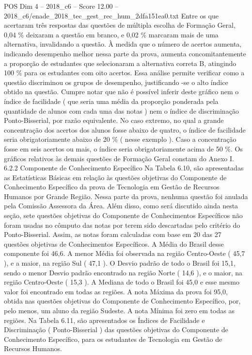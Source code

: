 \begin{textsample}{POS Dim 4 – 2018\_c6 – Score 12.00 – 2018\_c6/enade\_2018\_tec\_gest\_rec\_hum\_2dfa151ea0.txt}
Entre os que acertaram três respostas das questões de múltipla escolha de Formação Geral, 0,04 \% deixaram a questão em branco, e 0,02 \% marcaram mais de uma alternativa, invalidando a questão.
À medida que o número de acertos aumenta, indicando desempenho melhor nessa parte da prova, aumenta concomitantemente a proporção de estudantes que selecionaram a alternativa correta B, atingindo 100 \% para os estudantes com oito acertos.
Essa análise permite verificar como a questão discriminou os grupos de desempenho, justificando -se o alto índice obtido na questão.
Cumpre notar que não é possível inferir deste gráfico nem o índice de facilidade ( que seria uma média da proporção ponderada pela quantidade de alunos com cada uma das notas ) nem o índice de discriminação Ponto-Bisserial, por razão equivalente.
No caso extremo, no qual a grande concentração dos acertos dos alunos fosse abaixo de quatro, o índice de facilidade seria obrigatoriamente abaixo de 20 \% ( nesse exemplo ).
Caso a concentração fosse em seis acertos ou mais, o índice seria obrigatoriamente acima de 50 \%.
Os gráficos relativos às demais questões de Formação Geral constam do Anexo I. 6.2.2 Componente de Conhecimento Específico Na Tabela 6.10, são apresentadas as Estatísticas Básicas em relação às questões objetivas do Componente de Conhecimento Específico da prova de Tecnologia em Gestão de Recursos Humanos por Grande Região.
Nessa parte da prova, nenhuma questão foi anulada pela Comissão Assessora da Área.
Além disso, como será discutido ainda nesta seção, sete questões objetivas do Componente de Conhecimentos Específicos não foram usadas no cômputo das notas por terem sido descartadas pelo critério do Ponto-Bisserial.
Assim, as notas foram calculadas com base em 20 das 27 questões objetivas de Conhecimentos Específicos.
A Média do Brasil desse componente foi 46,6.
A menor Média foi observada na região Centro-Oeste ( 45,7 ), e a maior, na região Sul ( 47,1 ).
O Desvio padrão de todo o Brasil foi 15,1, sendo o menor Desvio padrão encontrado na região Norte ( 14,6 ), e o maior, na região Centro-Oeste ( 15,3 ).
A Mediana de todo o Brasil foi 45,0 e esse mesmo valor foi encontrado em todas as regiões.
A nota Máxima da prova foi 95,0, obtida nas questões objetivas do Componente de Conhecimento Específico, por, pelo menos, um aluno da região Sudeste.
A nota Mínima foi zero em todas as regiões.
Na Tabela 6.11, são apresentados os Índices de Facilidade e Discriminação ( Ponto-Bisserial ) das questões objetivas do Componente de Conhecimento Específico, para os estudantes de Tecnologia em Gestão de Recursos Humanos.

\end{textsample}
